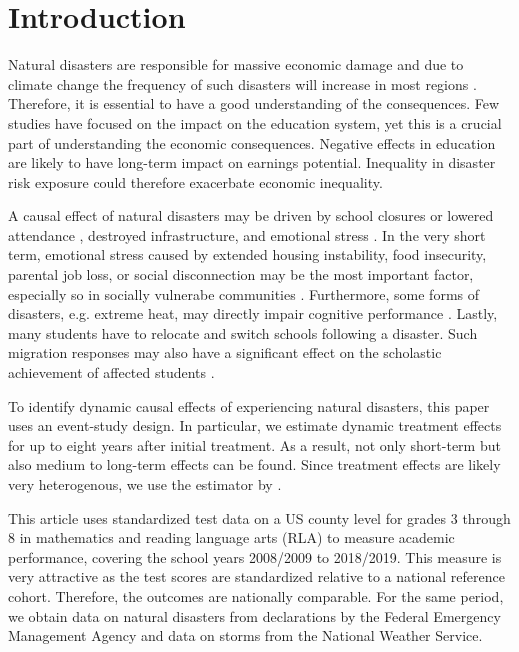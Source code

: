 
\section{Introduction}

Natural disasters are responsible for massive economic damage and due to climate change the frequency of such disasters will increase in most regions \citep{IPCC_2021}. Therefore, it is essential to have a good understanding of the consequences. Few studies have focused on the impact on the education system, yet this is a crucial part of understanding the economic consequences. Negative effects in education are likely to have long-term impact on earnings potential. Inequality in disaster risk exposure could therefore exacerbate economic inequality.

A causal effect of natural disasters may be driven by school closures \citep{Grewening_2020} or lowered attendance \citep{Spencer_2016}, destroyed infrastructure, and emotional stress \citep{Vogel_2016}. In the very short term, emotional stress caused by extended housing instability, food insecurity, parental job loss, or social disconnection may be the most important factor, especially so in socially vulnerabe communities \citep{Gao_2022}. Furthermore, some forms of disasters, e.g. extreme heat, may directly impair cognitive performance \citep{Ramsey_1995}. Lastly, many students have to relocate and switch schools following a disaster. Such migration responses may also have a significant effect on the scholastic achievement of affected students \citep{Pane_2008, Sacerdote_2012}.

To identify dynamic causal effects of experiencing natural disasters, this paper uses an event-study design. In particular, we estimate dynamic treatment effects for up to eight years after initial treatment. As a result, not only short-term but also medium to long-term effects can be found. Since treatment effects are likely very heterogenous, we use the estimator by \cite{Sun_2021}. 

This article uses standardized test data on a US county level for grades 3 through 8 in mathematics and reading language arts (RLA) to measure academic performance, covering the school years 2008/2009 to 2018/2019. This measure is very attractive as the test scores are standardized relative to a national reference cohort. Therefore, the outcomes are nationally comparable. For the same period, we obtain data on natural disasters from declarations by the Federal Emergency Management Agency and data on storms from the National Weather Service.

